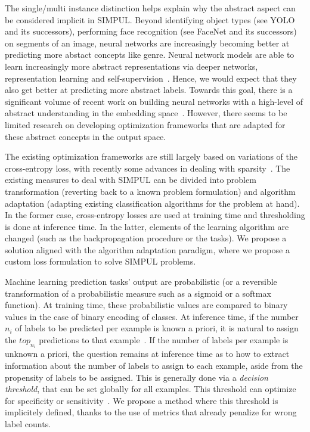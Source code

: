 The single/multi instance distinction helps explain why the abstract aspect can be considered implicit in SIMPUL. Beyond identifying object types (see YOLO \cite{YOLO} and its successors), performing face recognition (see FaceNet \cite{FaceNet} and its successors) on segments of an image, neural networks are increasingly becoming better at predicting more abstact concepts like genre.  Neural network models are able to learn increasingly more abstract representations via deeper networks, representation learning and self-supervision~\citep[see, e.g.,][]{SS,Rep}. Hence, we would expect that they also get better at predicting more abstract labels. Towards this goal, there is a significant volume of recent work on building neural networks with a high-level of abstract understanding in the embedding space~. However, there seems to be limited research on developing optimization frameworks that are adapted for these abstract concepts in the output space. 

The existing optimization frameworks are still largely based on variations of the cross-entropy loss, with recently some advances in dealing with sparsity~\citep[see, e.g.,][]{focalLoss,tencent}. The existing measures to deal with SIMPUL can be divided into problem transformation (reverting back to a known problem formulation) and algorithm adaptation (adapting existing classification algorithms for the problem at hand). In the former case, cross-entropy losses are used at training time and thresholding is done at inference time. In the latter, elements of the learning algorithm are changed (such as the backpropagation procedure or the tasks). We propose a solution aligned with the algorithm adaptation paradigm, where we propose a custom loss formulation to solve SIMPUL problems.

Machine learning prediction tasks' output are probabilistic (or a reversible transformation of a probabilistic measure such as a sigmoid or a softmax function). At training time, these probabilistic values are compared to binary values in the case of binary encoding of classes. At inference time, if the number $n_i$ of labels to be predicted per example is known a priori, it is natural to assign the $top_{n_i}$ predictions to that example~\cite{lossTopKError, topKmulticlassSVM}. If the number of labels per example is unknown a priori, the question remains at inference time as to how to extract information about the number of labels to assign to each example, aside from the propensity of labels to be assigned. This is generally done via a \emph{decision threshold}, that can be set globally for all examples. This threshold can optimize for specificity or sensitivity~\cite{decisionThreshold}. We propose a method where this threshold is implicitely defined, thanks to the use of metrics that already penalize for wrong label counts.

